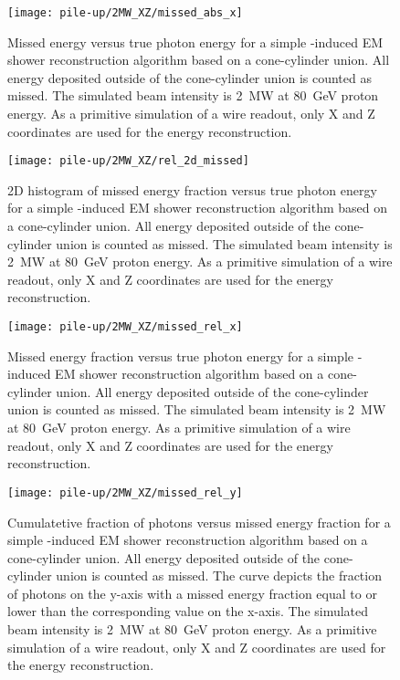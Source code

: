 \begin{figure}[htb]
	\centering
	\texttt{[image: pile-up/2MW\_XZ/missed\_abs\_x]}
	\caption{Missed energy versus true photon energy for a simple \Pgpz-induced EM shower reconstruction algorithm based on a cone-cylinder union.
		All energy deposited outside of the cone-cylinder union is counted as missed.
		The simulated beam intensity is \SI{2}{\mega\watt} at \SI{80}{\giga\electronvolt} proton energy.
		As a primitive simulation of a wire readout, only X and Z coordinates are used for the energy reconstruction.}
\end{figure}

\begin{figure}[htb]
	\centering
	\texttt{[image: pile-up/2MW\_XZ/rel\_2d\_missed]}
	\caption{2D histogram of missed energy fraction versus true photon energy for a simple \Pgpz-induced EM shower reconstruction algorithm based on a cone-cylinder union.
		All energy deposited outside of the cone-cylinder union is counted as missed.
		The simulated beam intensity is \SI{2}{\mega\watt} at \SI{80}{\giga\electronvolt} proton energy.
		As a primitive simulation of a wire readout, only X and Z coordinates are used for the energy reconstruction.}
\end{figure}

\begin{figure}[htb]
	\centering
	\texttt{[image: pile-up/2MW\_XZ/missed\_rel\_x]}
	\caption{Missed energy fraction versus true photon energy for a simple \Pgpz-induced EM shower reconstruction algorithm based on a cone-cylinder union.
		All energy deposited outside of the cone-cylinder union is counted as missed.
		The simulated beam intensity is \SI{2}{\mega\watt} at \SI{80}{\giga\electronvolt} proton energy.
		As a primitive simulation of a wire readout, only X and Z coordinates are used for the energy reconstruction.}
\end{figure}

\begin{figure}[htb]
	\centering
	\texttt{[image: pile-up/2MW\_XZ/missed\_rel\_y]}
	\caption{Cumulatetive fraction of photons versus missed energy fraction for a simple \Pgpz-induced EM shower reconstruction algorithm based on a cone-cylinder union.
		All energy deposited outside of the cone-cylinder union is counted as missed.
		The curve depicts the fraction of photons on the y-axis with a missed energy fraction equal to or lower than the corresponding value on the x-axis.
		The simulated beam intensity is \SI{2}{\mega\watt} at \SI{80}{\giga\electronvolt} proton energy.
		As a primitive simulation of a wire readout, only X and Z coordinates are used for the energy reconstruction.}
\end{figure}

